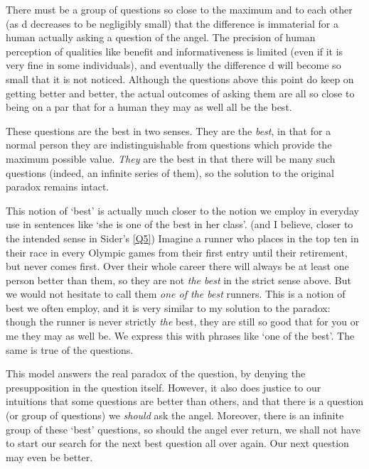 There must be a group of questions so close to the maximum and to each other (as d decreases to be negligibly small) that the difference is immaterial for a human actually asking a question of the angel.
The precision of human perception of qualities like benefit and informativeness is limited (even if it is very fine in some individuals), and eventually the difference d will become so small that it is not noticed.
Although the questions above this point do keep on getting better and better, the actual outcomes of asking them are all so close to being on a par that for a human they may as well all be the best.

These questions are the best in two senses.
They are the \emph{best}, in that for a normal person they are indistinguishable from questions which provide the maximum possible value.
\emph{They} are the best in that there will be many such questions (indeed, an infinite series of them), so the solution to the original paradox remains intact.

This notion of `best' is actually much closer to the notion we employ in everyday use in sentences like `she is one of the best in her class'. (and I believe, closer to the intended sense in Sider's \ref{Q5})
Imagine a runner who places in the top ten in their race in every Olympic games from their first entry until their retirement, but never comes first.
Over their whole career there will always be at least one person better than them, so they are not \emph{the best} in the strict sense above.
But we would not hesitate to call them \emph{one of the best} runners.
This is a notion of best we often employ, and it is very similar to my solution to the paradox: though the runner is never strictly \emph{the} best, they are still so good that for you or me they may as well be.
We express this with phrases like `one of the best'.
The same is true of the questions.

This model answers the real paradox of the question, by denying the presupposition in the question itself.
However, it also does justice to our intuitions that some questions are better than others, and that there is a question (or group of questions) we \emph{should} ask the angel.
Moreover, there is an infinite group of these `best' questions, so should the angel ever return, we shall not have to start our search for the next best question all over again.
Our next question may even be better.
